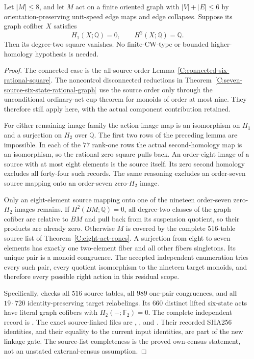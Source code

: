 \begin{theorem}
\label{C:eight-source-six-state-rational-graph}
Let $|M|\leq8$, and let $M$ act on a finite oriented graph with
$|V|+|E|\leq6$ by orientation-preserving unit-speed edge maps
and edge collapses.  Suppose its graph cofiber $X$ satisfies
\[
 H_1(X;\mathbb Q)=0,\qquad H^2(X;\mathbb Q)=\mathbb Q.
\]
Then its degree-two square vanishes.  No finite-CW-type or bounded
higher-homology hypothesis is needed.
\end{theorem}
\begin{proof}
The connected case is the all-source-order
Lemma~\ref{C:connected-six-rational-square}.  The noncontrol
disconnected reductions in
Theorem~\ref{C:seven-source-six-state-rational-graph} use the
source order only through the unconditional ordinary-act cup
theorem for monoids of order at most nine.  They therefore still
apply here, with the actual component contribution retained.

For either remaining image family the action-image map is an
isomorphism on $H_1$ and a surjection on $H_2$ over $\mathbb Q$.
The first two rows of the preceding lemma are impossible.
In each of the $77$ rank-one rows the actual second-homology
map is an isomorphism, so the rational zero square pulls back.
An order-eight image of a source with at most eight elements is
the source itself.  Its zero second homology excludes all
forty-four such records.  The same reasoning excludes an
order-seven source mapping onto an order-seven zero-$H_2$ image.

Only an eight-element source mapping onto one of the nineteen
order-seven zero-$H_2$ images remains.  If
$H^2(BM;\mathbb Q)=0$, all degree-two classes of the graph cofiber
are relative to $BM$ and pull back from its suspension quotient,
so their products are already zero.  Otherwise $M$ is covered by
the complete $516$-table source list of
Theorem~\ref{C:eight-act-cones}.  A surjection from eight to seven
elements has exactly one two-element fiber and all other fibers
singletons.  Its unique pair is a monoid congruence.  The accepted
independent enumeration tries every such pair, every quotient
isomorphism to the nineteen target monoids, and therefore every
possible right action in this residual scope.

Specifically,
checks all $516$ source tables, all $989$ one-pair congruences,
and all $19\cdot720$ identity-preserving target relabelings.
Its $660$ distinct lifted six-state acts have literal graph
cofibers with $H_2(-;\mathbb F_2)=0$.  The complete independent
record is
.
The exact source-linked files are
,
, and
.
Their recorded SHA256 identities, and their equality to the
current input identities, are part of the new linkage gate.
The source-list completeness is the proved own-census statement,
not an unstated external-census assumption.


\end{proof}
